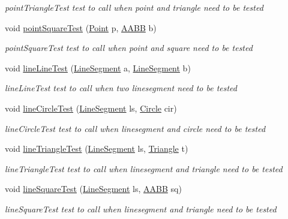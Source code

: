 \begin{DoxyCompactItemize}
\begin{DoxyCompactList}\small\item\em point\+Triangle\+Test test to call when point and triangle need to be tested \end{DoxyCompactList}\item 
void \hyperlink{class_canvas_ac9278bae8055ec5b0f047393d2f140b2}{point\+Square\+Test} (\hyperlink{class_point}{Point} p, \hyperlink{class_a_a_b_b}{A\+A\+BB} b)
\begin{DoxyCompactList}\small\item\em point\+Square\+Test test to call when point and square need to be tested \end{DoxyCompactList}\item 
void \hyperlink{class_canvas_ac3e9882133dc6c55f8ff3bb119a8ed84}{line\+Line\+Test} (\hyperlink{class_line_segment}{Line\+Segment} a, \hyperlink{class_line_segment}{Line\+Segment} b)
\begin{DoxyCompactList}\small\item\em line\+Line\+Test test to call when two linesegment need to be tested \end{DoxyCompactList}\item 
void \hyperlink{class_canvas_a1c17d6af0a8770dc2022986cd27e4de4}{line\+Circle\+Test} (\hyperlink{class_line_segment}{Line\+Segment} ls, \hyperlink{class_circle}{Circle} cir)
\begin{DoxyCompactList}\small\item\em line\+Circle\+Test test to call when linesegment and circle need to be tested \end{DoxyCompactList}\item 
void \hyperlink{class_canvas_a39de2e31ab9a27b918fc4f7e78ee2030}{line\+Triangle\+Test} (\hyperlink{class_line_segment}{Line\+Segment} ls, \hyperlink{class_triangle}{Triangle} t)
\begin{DoxyCompactList}\small\item\em line\+Triangle\+Test test to call when linesegment and triangle need to be tested \end{DoxyCompactList}\item 
void \hyperlink{class_canvas_a2eaf680341aebbab7792cd136c2be950}{line\+Square\+Test} (\hyperlink{class_line_segment}{Line\+Segment} ls, \hyperlink{class_a_a_b_b}{A\+A\+BB} sq)
\begin{DoxyCompactList}\small\item\em line\+Square\+Test test to call when linesegment and triangle need to be tested \end{DoxyCompactList}\item 

\end{DoxyCompactItemize}
